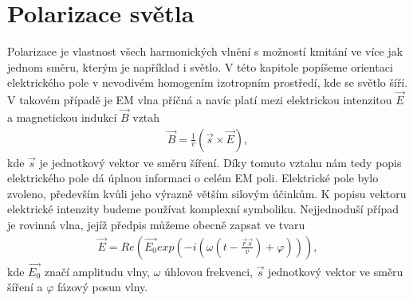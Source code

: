\chapter{Polarizace světla}
Polarizace je vlastnost všech harmonických vlnění s možností kmitání ve více jak jednom směru, kterým je například i světlo. V této kapitole popíšeme orientaci elektrického pole v nevodivém homogením izotropním prostředí, kde se světlo šíří. V takovém případě je EM vlna příčná a navíc platí mezi elektrickou intenzitou $\vec{E}$ a magnetickou indukcí $\vec{B}$ vztah
\begin{eqnarray}
\vec{B}=\frac{1}{v}(\vec{s}\times\vec{E}),
\end{eqnarray}
kde $\vec{s}$ je jednotkový vektor ve směru šíření. Díky tomuto vztahu nám tedy popis elektrického pole dá úplnou informaci o celém EM poli. Elektrické pole bylo zvoleno, především kvůli jeho výrazně větším silovým účinkům.
K popisu vektoru elektrické intenzity budeme používat komplexní symboliku. Nejjednoduší případ je rovinná vlna, jejíž předpis můžeme obecně zapsat ve tvaru
\begin{eqnarray}
\vec{E}=Re(\vec{E_0}exp(-i(\omega(t-\frac{\vec{r}\vec{s}}{v})+\varphi))),
\label{rovinna vlna}
\end{eqnarray}
kde $\vec{E_0}$ značí amplitudu vlny, $\omega$ úhlovou frekvenci, $\vec{s}$ jednotkový vektor ve směru šíření a $\varphi$ fázový posun vlny.

